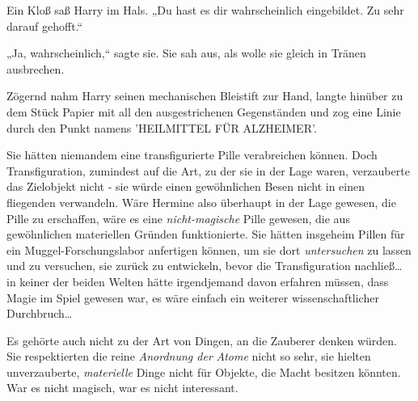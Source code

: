 Ein Kloß saß Harry im Hals. „Du hast es dir wahrscheinlich eingebildet. Zu sehr darauf gehofft.“

„Ja, wahrscheinlich,“ sagte sie. Sie sah aus, als wolle sie gleich in Tränen ausbrechen.

Zögernd nahm Harry seinen mechanischen Bleistift zur Hand, langte hinüber zu dem Stück Papier mit all den ausgestrichenen Gegenständen und zog eine Linie durch den Punkt namens 'HEILMITTEL FÜR ALZHEIMER'.

Sie hätten niemandem eine transfigurierte Pille verabreichen können. Doch Transfiguration, zumindest auf die Art, zu der sie in der Lage waren, verzauberte das Zielobjekt nicht - sie würde einen gewöhnlichen Besen nicht in einen fliegenden verwandeln. Wäre Hermine also überhaupt in der Lage gewesen, die Pille zu erschaffen, wäre es eine \emph{nicht-magische} Pille gewesen, die aus gewöhnlichen materiellen Gründen funktionierte. Sie hätten insgeheim Pillen für ein Muggel-Forschungslabor anfertigen können, um sie dort \emph{untersuchen} zu lassen und zu versuchen, sie zurück zu entwickeln, bevor die Transfiguration nachließ… in keiner der beiden Welten hätte irgendjemand davon erfahren müssen, dass Magie im Spiel gewesen war, es wäre einfach ein weiterer wissenschaftlicher Durchbruch…

Es gehörte auch nicht zu der Art von Dingen, an die Zauberer denken würden. Sie respektierten die reine \emph{Anordnung der} \emph{Atome} nicht so sehr, sie hielten unverzauberte, \emph{materielle} Dinge nicht für Objekte, die Macht besitzen könnten. War es nicht magisch, war es nicht interessant.


